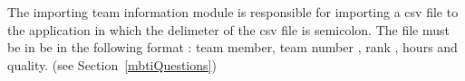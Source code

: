 The importing team information module is responsible for importing a csv file to the application in which the delimeter of the csv file is semicolon. The file must be in be in the following format : team member, team number , rank , hours and quality. (see Section~\ref{mbtiQuestions})